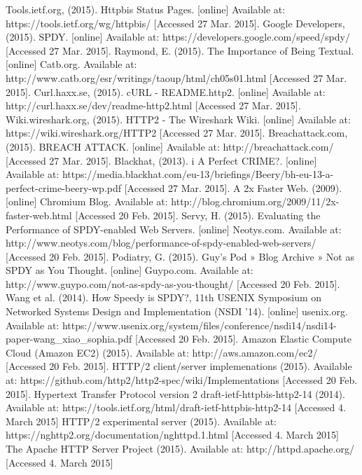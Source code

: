 \documentclass{article}
\begin{document}
\begin{thebibliography}
Tools.ietf.org, (2015). Httpbis Status Pages. [online] Available at: https://tools.ietf.org/wg/httpbis/ [Accessed 27 Mar. 2015].
Google Developers, (2015). SPDY. [online] Available at: https://developers.google.com/speed/spdy/ [Accessed 27 Mar. 2015].
Raymond, E. (2015). The Importance of Being Textual. [online] Catb.org. Available at: http://www.catb.org/esr/writings/taoup/html/ch05s01.html [Accessed 27 Mar. 2015].
Curl.haxx.se, (2015). cURL - README.http2. [online] Available at: http://curl.haxx.se/dev/readme-http2.html [Accessed 27 Mar. 2015].
Wiki.wireshark.org, (2015). HTTP2 - The Wireshark Wiki. [online] Available at: https://wiki.wireshark.org/HTTP2 [Accessed 27 Mar. 2015].
Breachattack.com, (2015). BREACH ATTACK. [online] Available at: http://breachattack.com/ [Accessed 27 Mar. 2015].
Blackhat, (2013). i A Perfect CRIME?. [online] Available at: https://media.blackhat.com/eu-13/briefings/Beery/bh-eu-13-a-perfect-crime-beery-wp.pdf [Accessed 27 Mar. 2015].
A 2x Faster Web. (2009). [online] Chromium Blog. Available at: http://blog.chromium.org/2009/11/2x-faster-web.html [Accessed 20 Feb. 2015].
Servy, H. (2015). Evaluating the Performance of SPDY-enabled Web Servers. [online] Neotys.com. Available at: http://www.neotys.com/blog/performance-of-spdy-enabled-web-servers/ [Accessed 20 Feb. 2015].
Podiatry, G. (2015). Guy's Pod » Blog Archive » Not as SPDY as You Thought. [online] Guypo.com. Available at: http://www.guypo.com/not-as-spdy-as-you-thought/ [Accessed 20 Feb. 2015].
Wang et al. (2014). How Speedy is SPDY?, 11th USENIX Symposium on Networked Systems Design and Implementation (NSDI ’14). [online] usenix.org. Available at:
https://www.usenix.org/system/files/conference/nsdi14/nsdi14-paper-wang\_xiao\_sophia.pdf [Accessed 20 Feb. 2015].
 Amazon Elastic Compute Cloud (Amazon EC2) (2015). Available at: http://aws.amazon.com/ec2/ [Accessed 20 Feb. 2015].
  HTTP/2 client/server implemenations (2015). Available at: https://github.com/http2/http2-spec/wiki/Implementations [Accessed 20 Feb. 2015].
 Hypertext Transfer Protocol version 2 draft-ietf-httpbis-http2-14 (2014). Available at: https://tools.ietf.org/html/draft-ietf-httpbis-http2-14 [Accessed 4. March 2015]
 HTTP/2 experimental server (2015). Available at: https://nghttp2.org/documentation/nghttpd.1.html [Accessed 4. March 2015]
 The Apache HTTP Server Project (2015). Available at: http://httpd.apache.org/ [Accessed 4. March 2015]

\end{thebibliography}
\end{document}
